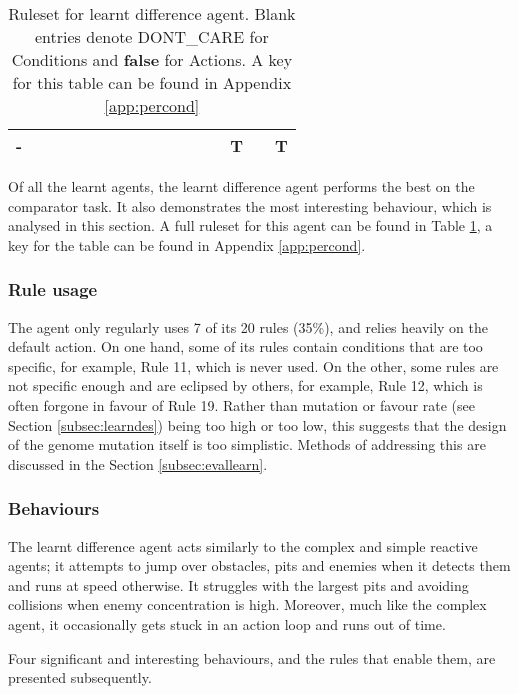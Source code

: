 \begin{table}[!t]
\begin{adjustwidth}{-2cm}{-2cm}
\begin{center}
\begin{tabular}{ | c | c | c | c | c | c | c | c | c | c | c | c || c | c | c | c |}
	-  & & & & & & & & & & & 		& & T & & T \\ \hline
    \end{tabular}
  \end{center}
  \end{adjustwidth}
  \caption{Ruleset for learnt difference agent. Blank entries denote {\scriptsize DONT\_CARE} for Conditions and \textbf{false} for Actions. A key for this table can be found in Appendix \ref{app:percond}}
  \label{tab:LDA}
\end{table}

Of all the learnt agents, the learnt difference agent performs the best on the comparator task. It also demonstrates the most interesting behaviour, which is analysed in this section. A full ruleset for this agent can be found in Table \ref{tab:LDA}, a key for the table can be found in Appendix \ref{app:percond}.

\subsubsection{Rule usage}

The agent only regularly uses 7 of its 20 rules (35\%), and relies heavily on the default action. On one hand, some of its rules contain conditions that are too specific, for example, Rule 11, which is never used. On the other, some rules are not specific enough and are eclipsed by others, for example, Rule 12, which is often forgone in favour of Rule 19. Rather than mutation or favour rate (see Section \ref{subsec:learndes}) being too high or too low, this suggests that the design of the genome mutation itself is too simplistic. Methods of addressing this are discussed in the Section \ref{subsec:evallearn}.

\subsubsection{Behaviours}

The learnt difference agent acts similarly to the complex and simple reactive agents; it attempts to jump over obstacles, pits and enemies when it detects them and runs at speed otherwise. It struggles with the largest pits and avoiding collisions when enemy concentration is high. Moreover, much like the complex agent, it occasionally gets stuck in an action loop and runs out of time.

Four significant and interesting behaviours, and the rules that enable them, are presented subsequently. 


